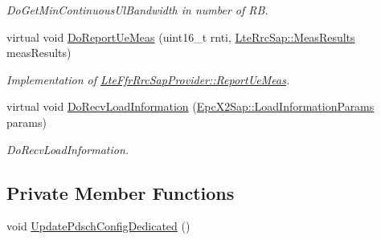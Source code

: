 \begin{DoxyCompactItemize}
\begin{DoxyCompactList}\small\item\em Do\+Get\+Min\+Continuous\+Ul\+Bandwidth in number of RB. \end{DoxyCompactList}\item 
virtual void \hyperlink{classns3_1_1LteFfrSimple_a91ba3cb67b4c02bfba9fc284e2cc0bd4}{Do\+Report\+Ue\+Meas} (uint16\+\_\+t rnti, \hyperlink{structns3_1_1LteRrcSap_1_1MeasResults}{Lte\+Rrc\+Sap\+::\+Meas\+Results} meas\+Results)
\begin{DoxyCompactList}\small\item\em Implementation of \hyperlink{classns3_1_1LteFfrRrcSapProvider_aefa0779641b8432a7d3406b519ca7e59}{Lte\+Ffr\+Rrc\+Sap\+Provider\+::\+Report\+Ue\+Meas}. \end{DoxyCompactList}\item 
virtual void \hyperlink{classns3_1_1LteFfrSimple_a7b6d5ec04f41a9cd98ec9ee16590a3f3}{Do\+Recv\+Load\+Information} (\hyperlink{structns3_1_1EpcX2Sap_1_1LoadInformationParams}{Epc\+X2\+Sap\+::\+Load\+Information\+Params} params)
\begin{DoxyCompactList}\small\item\em Do\+Recv\+Load\+Information. \end{DoxyCompactList}\end{DoxyCompactItemize}
\subsection*{Private Member Functions}
\begin{DoxyCompactItemize}
\item 
void \hyperlink{classns3_1_1LteFfrSimple_afb8f24c4148fd2b27dea426e286a92f8}{Update\+Pdsch\+Config\+Dedicated} ()
\end{DoxyCompactItemize}
